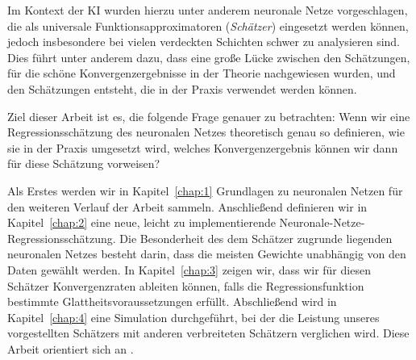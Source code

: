 Im Kontext der KI wurden hierzu unter anderem neuronale Netze vorgeschlagen, die als universale Funktionsapproximatoren (\emph{Schätzer}) eingesetzt werden können, jedoch insbesondere bei vielen verdeckten Schichten schwer zu analysieren sind. 
Dies führt unter anderem dazu, dass eine große Lücke zwischen den Schätzungen, für die schöne Konvergenzergebnisse in der Theorie nachgewiesen wurden, und den Schätzungen entsteht, die in der Praxis verwendet werden können.

Ziel dieser Arbeit ist es, die folgende Frage genauer zu betrachten: Wenn wir eine Regressionsschätzung des neuronalen Netzes theoretisch genau so definieren, wie sie in der Praxis umgesetzt wird, welches Konvergenzergebnis können wir dann für diese Schätzung vorweisen? 

Als Erstes werden wir in Kapitel~\ref{chap:1} Grundlagen zu neuronalen Netzen für den weiteren Verlauf der Arbeit sammeln.
Anschließend definieren wir in Kapitel~\ref{chap:2} eine neue, leicht zu implementierende Neuronale-Netze-Regressionsschätzung. Die Besonderheit des dem Schätzer zugrunde liegenden neuronalen Netzes besteht darin, dass die meisten Gewichte unabhängig von den Daten gewählt werden.
In Kapitel~\ref{chap:3} zeigen wir, dass wir für diesen Schätzer Konvergenzraten ableiten können, falls die Regressionsfunktion bestimmte Glattheitsvoraussetzungen erfüllt. 
Abschließend wird in Kapitel~\ref{chap:4} eine Simulation durchgeführt, bei der die Leistung unseres vorgestellten Schätzers mit anderen verbreiteten Schätzern verglichen wird. Diese Arbeit orientiert sich an \cite{kohler19}.

